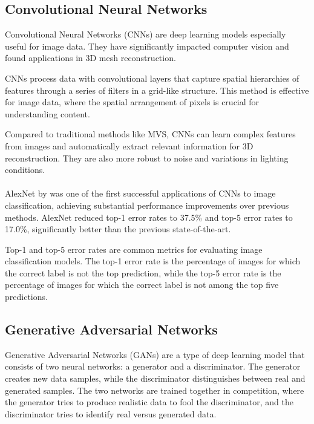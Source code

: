 \subsection{Convolutional Neural Networks} \label{section:cnns}
Convolutional Neural Networks (CNNs) are deep learning models especially useful for image data. They have significantly impacted computer vision and found applications in 3D mesh reconstruction.

CNNs process data with convolutional layers that capture spatial hierarchies of features through a series of filters in a grid-like structure. This method is effective for image data, where the spatial arrangement of pixels is crucial for understanding content.

Compared to traditional methods like MVS, CNNs can learn complex features from images and automatically extract relevant information for 3D reconstruction. They are also more robust to noise and variations in lighting conditions.
\paragraph{}
AlexNet by \textcite{krizhevsky_imagenet_2012} was one of the first successful applications of CNNs to image classification, achieving substantial performance improvements over previous methods. AlexNet reduced top-1 error rates to 37.5\% and top-5 error rates to 17.0\%, significantly better than the previous state-of-the-art.

Top-1 and top-5 error rates are common metrics for evaluating image classification models. The top-1 error rate is the percentage of images for which the correct label is not the top prediction, while the top-5 error rate is the percentage of images for which the correct label is not among the top five predictions.

\subsection{Generative Adversarial Networks} \label{section:gans}
Generative Adversarial Networks (GANs) \autocite{goodfellow_generative_2014} are a type of deep learning model that consists of two neural networks: a generator and a discriminator. The generator creates new data samples, while the discriminator distinguishes between real and generated samples. The two networks are trained together in competition, where the generator tries to produce realistic data to fool the discriminator, and the discriminator tries to identify real versus generated data.
